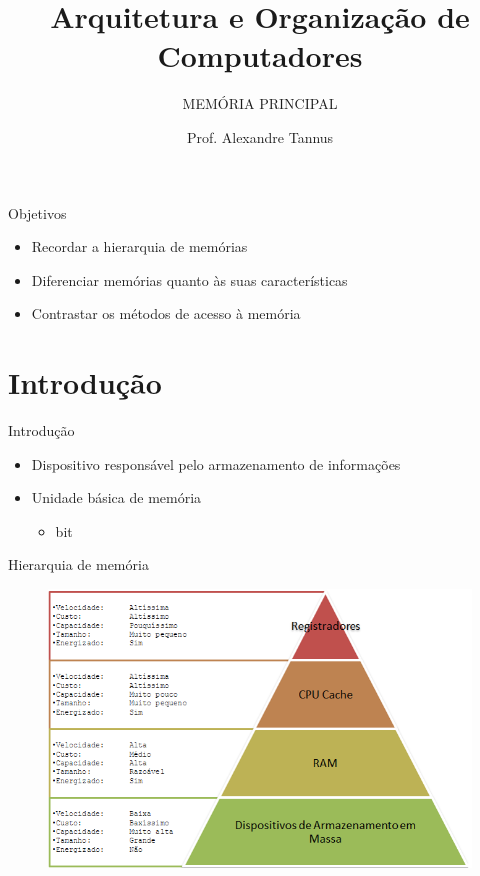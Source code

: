 \documentclass[aspectratio=169,
				xcolor=table]{beamer}
\institute[]{\uppercase{Engenharia de Software}}
\title[]{Arquitetura e Organização de Computadores}
\subtitle[]{\uppercase{Memória Principal}}
\author[]{Prof. Alexandre Tannus}
\date{}
\begin{document}
	\begin{frame}
		\titlepage
	\end{frame}

	\begin{frame}{Objetivos}
		\begin{itemize}
			\item Recordar a hierarquia de memórias
			\vspace{1em}
			\item Diferenciar memórias quanto às suas características
			\vspace{1em} 
			\item Contrastar os métodos de acesso à memória			
		\end{itemize}
	\end{frame}

	\begin{frame}
		\tableofcontents		
	\end{frame}	
	
	\section{Introdução}
	
	\begin{frame}{Introdução}
		\begin{itemize}
			\item Dispositivo responsável pelo armazenamento de informações
			\vspace{1em}
			\item Unidade básica de memória
			\begin{itemize}
				\item bit
			\end{itemize}
		\end{itemize}
	\end{frame}
	
	\begin{frame}{Hierarquia de memória}
		\begin{figure}[hbtp]
			\centering
			\includegraphics[height=0.83\textheight, keepaspectratio]{../figs/cap07/memoria.png}
		\end{figure}
	\end{frame}
		
\end{document}
